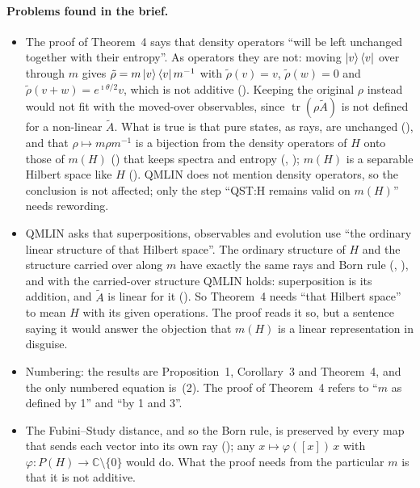 \documentclass[11pt]{article}
\begin{document}
\paragraph{Problems found in the brief.}
\begin{itemize}
\item The proof of Theorem~4 says that density operators ``will be left unchanged together
  with their entropy''. As operators they are not: moving $\ket{v}\bra{v}$ over through $m$
  gives $\tilde\rho = m\ket{v}\bra{v}m^{-1}$ with $\tilde\rho(v) = v$, $\tilde\rho(w) = 0$ and
  $\tilde\rho(v + w) = e^{\imath\theta/2}v$, which is not additive
  (). Keeping the original $\rho$ instead would not fit
  with the moved-over observables, since $\operatorname{tr}(\rho\tilde A)$ is not defined for a
  non-linear $\tilde A$. What is true is that pure states, as rays, are unchanged
  (), and that $\rho \mapsto m\rho m^{-1}$ is a bijection from the
  density operators of $H$ onto those of $m(H)$ () that keeps spectra and
  entropy (, ); $m(H)$ is a
  separable Hilbert space like $H$ (). QMLIN does not mention density
  operators, so the conclusion is not affected; only the step ``QST:H remains valid on
  $m(H)$'' needs rewording.
\item QMLIN asks that superpositions, observables and evolution use ``the ordinary linear
  structure of that Hilbert space''. The ordinary structure of $H$ and the structure carried
  over along $m$ have exactly the same rays and Born rule (,
  ), and with the carried-over structure QMLIN holds: superposition is
  its addition, and $\tilde A$ is linear for it (). So Theorem~4 needs
  ``that Hilbert space'' to mean $H$ with its given operations. The proof reads it so, but a
  sentence saying it would answer the objection that $m(H)$ is a linear representation in
  disguise.
\item Numbering: the results are Proposition~1, Corollary~3 and Theorem~4, and the only
  numbered equation is~(2). The proof of Theorem~4 refers to ``$m$ as defined by 1'' and ``by 1
  and 3''.
\item The Fubini--Study distance, and so the Born rule, is preserved by every map that sends
  each vector into its own ray (); any $x \mapsto \varphi([x])\,x$ with
  $\varphi \colon P(H) \to \mathbb{C}\setminus\{0\}$ would do. What the proof needs from the
  particular $m$ is that it is not additive.
\end{itemize}
\end{document}
